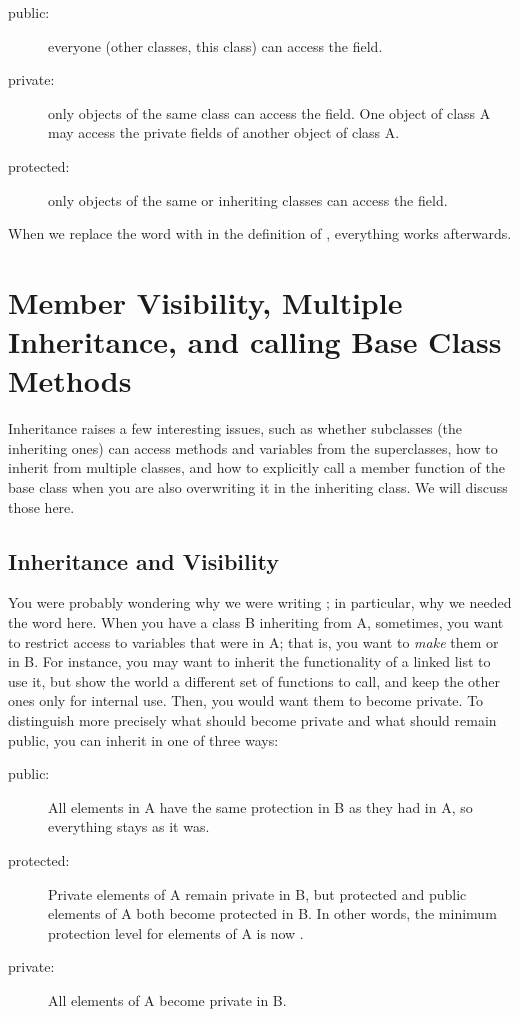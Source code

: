 \begin{description}
\item[public:] everyone (other classes, this class) can access the field.
\item[private:] only objects of the same class can access the
  field. One object of class A may access the private fields of
  another object of class A.
\item[protected:] only objects of the same or inheriting classes can
  access the field.
\end{description}

When we replace the word  with  in the
definition of , everything works afterwards.

\section{Member Visibility, Multiple Inheritance, and calling Base Class Methods}

Inheritance raises a few interesting issues,
such as whether subclasses (the inheriting ones) can access methods
and variables from the superclasses,
how to inherit from multiple classes,
and how to explicitly call a member function of the base class when
you are also overwriting it in the inheriting class.
We will discuss those here.

\subsection{Inheritance and Visibility}
You were probably wondering why we were writing 
; in particular, why we needed the word
 here.
When you have a class B inheriting from A, sometimes, you want to 
restrict access to variables that were  in A;
that is, you want to \emph{make} them  or
 in B.
For instance, you may  want to inherit the functionality of a linked
list to use it, but show the world a different set of functions to
call, and keep the other ones only for internal use.
Then, you would want them to become private. 
To distinguish more precisely what should become private and what
should remain public, you can inherit in one of three ways:

\begin{description}
\item[public:] All elements in A have the same protection in B as
  they had in A, so everything stays as it was.
\item[protected:] Private elements of A remain private in B, but
  protected and public elements of A both become protected in B. In
  other words, the minimum protection level for elements of A is now
  .
\item[private:]	All elements of A become private in B.
\end{description}

